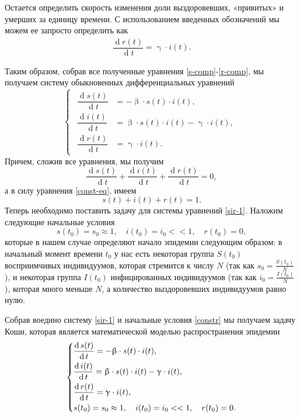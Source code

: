 \documentclass[a4paper, 14pt]{extreport}
\renewcommand{\beta}{\upbeta}
\renewcommand{\gamma}{\upgamma}
\renewcommand{\d}{\operatorname{d}}
\begin{document}
	Остается определить скорость изменения доли выздоровевших, «привитых» и умерших за единицу времени. С использованием введенных обозначений мы можем ее запросто определить как  
	\begin{eqnarray}
		\label{r-comp}
		\dfrac{\d r(t)}{\d t} = \gamma\cdot i(t).
	\end{eqnarray}
	
	Таким образом, собрав все полученные уравнения \eqref{s-comp}-\eqref{r-comp}, мы получаем систему обыкновенных дифференциальных уравнений
	\begin{equation}
		\label{sir-1}
		\left\{ 
		\begin{gathered} 
			\begin{aligned}
				\dfrac {\d s(t)}{\d t} &= -\beta \cdot s(t) \cdot i(t),\\
				\dfrac{\d i(t)}{\d t} &= \beta \cdot s(t)\cdot i(t) - \gamma\cdot i(t),\\
				\dfrac{\d r(t)}{\d t} &= \gamma\cdot i(t). 
			\end{aligned}
		\end{gathered} 
		\right.		
	\end{equation}
	Причем, сложив все уравнения, мы получим 
	\begin{equation}
		\dfrac {\d s(t)}{\d t} + \dfrac {\d i(t)}{\d t} + \dfrac {\d r(t)}{\d t} = 0,
	\end{equation}
	а в силу уравнения \eqref{const-eq}, имеем 
	\begin{equation}
		\label{const-eq-1}
		s(t) + i(t) + r(t) = 1.
	\end{equation}
	Теперь необходимо поставить задачу для системы уравнений \eqref{sir-1}. Наложим следующие начальные условия 
	\begin{equation}
		\label{constr}
		s(t_0) = s_0 \approx 1,\quad i(t_0) = i_0 << 1,\quad r(t_0) = 0,
	\end{equation}
	которые в нашем случае определяют начало эпидемии следующим образом: в начальный момент времени $t_0$ у нас есть некоторая группа $S(t_0)$ восприимчивых индивидуумов, которая стремится к числу $N$ (так как $s_0 = \frac{S(t_0)}N$), и некоторая группа $I(t_0)$ инфицированных индивидуумов (так как $i_0 = \frac{I(t_0)}N$), которая много меньше $N$, а количество выздоровевших индивидуумов равно нулю.
	
	Собрав воедино систему \eqref{sir-1} и начальные условия \eqref{constr} мы получаем задачу Коши, которая является математической моделью распространения эпидемии 
	$$
	\begin{dcases}
		\dfrac {\d s(t)}{\d t} = -\beta \cdot s(t) \cdot i(t),\\
		\dfrac{\d i(t)}{\d t} = \beta \cdot s(t)\cdot i(t) - \gamma\cdot i(t),\\
		\dfrac{\d r(t)}{\d t} = \gamma\cdot i(t),\\
		s(t_0) = s_0 \approx 1,\quad i(t_0) = i_0 << 1,\quad r(t_0) = 0.
	\end{dcases}
	$$
\end{document}
